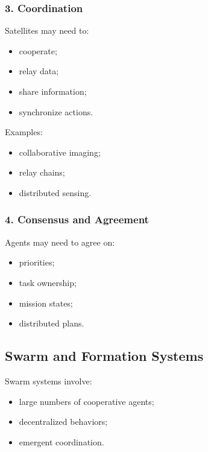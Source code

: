 \documentclass[10pt,a4paper,twocolumn]{article}
\begin{document}

\subsubsection*{3. Coordination}

Satellites may need to:
\begin{itemize}
    \item cooperate;
    \item relay data;
    \item share information;
    \item synchronize actions.
\end{itemize}

Examples:
\begin{itemize}
    \item collaborative imaging;
    \item relay chains;
    \item distributed sensing.
\end{itemize}


\subsubsection*{4. Consensus and Agreement}

Agents may need to agree on:
\begin{itemize}
    \item priorities;
    \item task ownership;
    \item mission states;
    \item distributed plans.
\end{itemize}


\subsection{Swarm and Formation Systems}

Swarm systems involve:
\begin{itemize}
    \item large numbers of cooperative agents;
    \item decentralized behaviors;
    \item emergent coordination.
\end{itemize}
\end{document}

